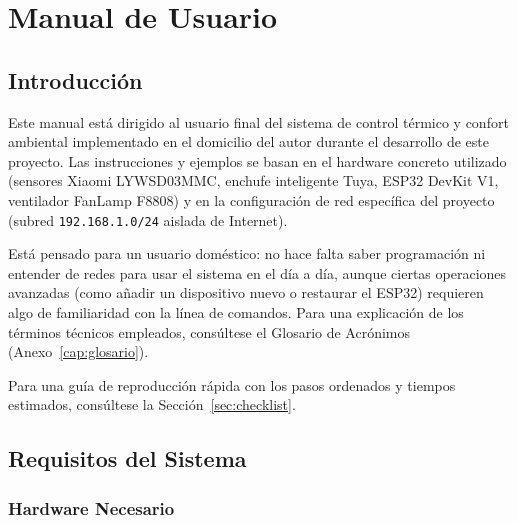 \chapter{Manual de Usuario}
\label{cap:manual_usuario}

\section{Introducción}

Este manual está dirigido al usuario final del sistema de control térmico y confort ambiental implementado en el domicilio del autor durante el desarrollo de este proyecto. Las instrucciones y ejemplos se basan en el hardware concreto utilizado (sensores Xiaomi LYWSD03MMC, enchufe inteligente Tuya, ESP32 DevKit V1, ventilador FanLamp F8808) y en la configuración de red específica del proyecto (subred \texttt{192.168.1.0/24} aislada de Internet).

Está pensado para un usuario doméstico: no hace falta saber programación ni entender de redes para usar el sistema en el día a día, aunque ciertas operaciones avanzadas (como añadir un dispositivo nuevo o restaurar el ESP32) requieren algo de familiaridad con la línea de comandos. Para una explicación de los términos técnicos empleados, consúltese el Glosario de Acrónimos (Anexo~\ref{cap:glosario}).

Para una guía de reproducción rápida con los pasos ordenados y tiempos estimados, consúltese la Sección~\ref{sec:checklist}.

\section{Requisitos del Sistema}

\subsection{Hardware Necesario}

